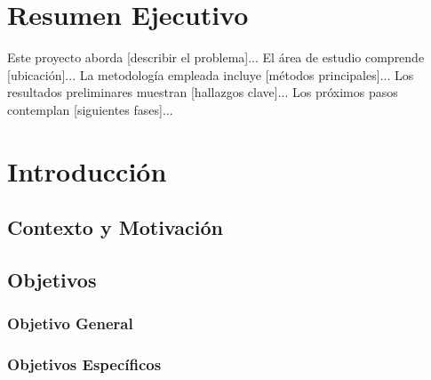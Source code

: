 \documentclass[11pt,letterpaper]{article}
\begin{document}

\newpage
\section*{Resumen Ejecutivo}


Este proyecto aborda [describir el problema]... El área de estudio comprende [ubicación]...
La metodología empleada incluye [métodos principales]... Los resultados preliminares
muestran [hallazgos clave]... Los próximos pasos contemplan [siguientes fases]...


\newpage
\tableofcontents
\newpage


\section{Introducción}

\subsection{Contexto y Motivación}


\subsection{Objetivos}

\subsubsection{Objetivo General}


\subsubsection{Objetivos Específicos}
\end{document}
